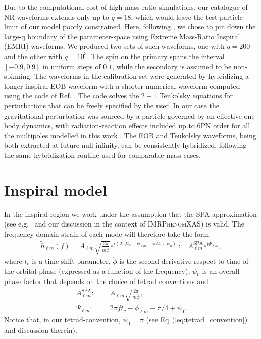 \documentclass[twocolumn,prd,aps,superscriptaddress,preprintnumbers,tightenlines,showpacs,nofootinbib,eqsecnum,amsfonts,amsmath]{revtex4}
\newcommand{\sascha}[1]{\textcolor{red}{Sascha: #1}}
\newcommand{\phX}{\textsc{IMRPhenomXAS}\xspace}
\begin{document}
Due to the computational cost of high mass-ratio simulations, our catalogue of NR waveforms extends only up to $q=18$, which would leave the test-particle limit of our model poorly constrained.  Here, following \cite{Keitel:2016krm}, we chose to pin down the large-q boundary of the parameter-space using Extreme Mass-Ratio Inspiral (EMRI) waveforms. We produced two sets of such waveforms, one with $q=200$ and the other with $q=10^3$. The spin on the primary spans the interval $[-0.9,0.9]$ in uniform steps of $0.1$, while the secondary is assumed to be non-spinning. The waveforms in the calibration set were generated by hybridizing a longer inspiral EOB waveform with a shorter numerical waveform computed using the code of Ref. \cite{Harms_2014}. The code solves the $2+1$ Teukolsky equations for perturbations that can be freely specified by the user.
In our case the gravitational perturbation was sourced by a particle governed by an effective-one-body dynamics, with radiation-reaction effects included up to 6PN order for all the multipoles modelled in this work \cite{EOB_RadiationReaction}. The EOB and Teukolsky waveforms, being both extracted at future null infinity, can be consistently hybridized, following the same hybridization routine used for comparable-mass cases. 




\section{Inspiral model} \label{sec:inspiral}

In the inspiral region we work under the assumption that the SPA approximation (see e.g.~\cite{Damour:2000gg} and our discussion in the context of \phX \cite{phenX}) is valid. The frequency domain strain of each mode will therefore take the form
\begin{align}
\label{eq:PNstrain}
\tilde h_{\ell m}(f)=A_{\ell m}\sqrt{\frac{2\pi}{m \ddot{\phi}}}e^{i \left(2\pi f t_c-\phi_{\ell m}-\pi/4+\psi_0\right)}:=A_{\ell m}^{\mathrm{SPA}}e^{i \Psi_{\ell m}},
\end{align}
where $t_c$ is a time shift parameter, $\ddot\phi$ is the second derivative respect to time of the orbital phase (expressed as a function of the frequency), $\psi_0$ is an overall phase factor that depends on the choice of tetrad conventions and 
\begin{align}
A_{\ell m}^{\mathrm{SPA}}:&=A_{\ell m}\sqrt{\frac{2\pi}{m \ddot{\phi}}}, \\
\Psi_{\ell m}:&=2\pi f t_c-\phi_{\ell m}-\pi/4+\psi_0.
\label{eq:psiLM}
\end{align} 
Notice that, in our tetrad-convention, $\psi_0=\pi$ (see Eq.\,(\ref{eq:tetrad_convention}) and discussion therein). 
\end{document}
